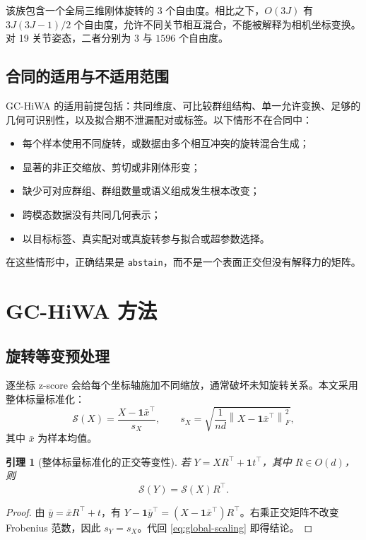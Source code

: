\documentclass[10pt,a4paper,fontset=windows]{ctexart}
\newcommand{\norm}[1]{\left\lVert #1\right\rVert}
\newtheorem{lemma}[theorem]{引理}
\theoremstyle{definition}
\theoremstyle{remark}
\begin{document}
该族包含一个全局三维刚体旋转的 $3$ 个自由度。相比之下，$O(3J)$ 有 $3J(3J-1)/2$ 个自由度，允许不同关节相互混合，不能被解释为相机坐标变换。对 19 关节姿态，二者分别为 $3$ 与 $1596$ 个自由度。

\subsection{合同的适用与不适用范围}
GC-HiWA 的适用前提包括：共同维度、可比较群组结构、单一允许变换、足够的几何可识别性，以及拟合期不泄漏配对或标签。以下情形不在合同中：
\begin{itemize}
  \item 每个样本使用不同旋转，或数据由多个相互冲突的旋转混合生成；
  \item 显著的非正交缩放、剪切或非刚体形变；
  \item 缺少可对应群组、群组数量或语义组成发生根本改变；
  \item 跨模态数据没有共同几何表示；
  \item 以目标标签、真实配对或真旋转参与拟合或超参数选择。
\end{itemize}
在这些情形中，正确结果是 \texttt{abstain}，而不是一个表面正交但没有解释力的矩阵。

\section{GC-HiWA 方法}
\label{sec:method}

\subsection{旋转等变预处理}
逐坐标 z-score 会给每个坐标轴施加不同缩放，通常破坏未知旋转关系。本文采用整体标量标准化：
\begin{equation}
\mathcal S(X)=\frac{X-\bm1\bar x^\top}{s_X},\qquad
s_X=\sqrt{\frac{1}{nd}\norm{X-\bm1\bar x^\top}_F^2},
\label{eq:global-scaling}
\end{equation}
其中 $\bar x$ 为样本均值。

\begin{lemma}[整体标量标准化的正交等变性]
\label{lem:equivariance}
若 $Y=XR^\top+\bm1t^\top$，其中 $R\in O(d)$，则
\begin{equation}
\mathcal S(Y)=\mathcal S(X)R^\top .
\end{equation}
\end{lemma}
\begin{proof}
由 $\bar y=\bar xR^\top+t$，有 $Y-\bm1\bar y^\top=(X-\bm1\bar x^\top)R^\top$。右乘正交矩阵不改变 Frobenius 范数，因此 $s_Y=s_X$。代回 \cref{eq:global-scaling} 即得结论。
\end{proof}
\end{document}
